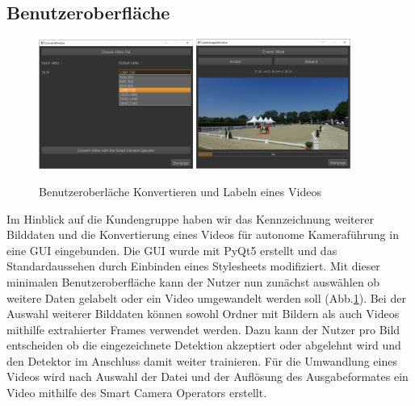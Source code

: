 \subsection*{Benutzeroberfläche}

\begin{figure}[b]
\centering
\includegraphics[width=0.45\textwidth]{./img/GuiConvert2.png}
\includegraphics[width=0.45\textwidth]{./img/GuiLabel.png}
\caption{Benutzeroberläche Konvertieren und Labeln eines Videos}
\label{fig:gui}
\end{figure}

Im Hinblick auf die Kundengruppe haben wir das Kennzeichnung weiterer Bilddaten und die Konvertierung eines Videos für autonome Kameraführung in eine GUI eingebunden. Die GUI wurde mit PyQt5 erstellt und das Standardaussehen durch Einbinden eines Stylesheets modifiziert. Mit dieser minimalen Benutzeroberfläche kann der Nutzer nun zunächst auswählen ob weitere Daten gelabelt oder ein Video umgewandelt werden soll (Abb.\ref{fig:gui}). Bei der Auswahl weiterer Bilddaten können sowohl Ordner mit Bildern als auch Videos mithilfe extrahierter Frames verwendet werden. Dazu kann der Nutzer pro Bild entscheiden ob die eingezeichnete Detektion akzeptiert oder abgelehnt wird und den Detektor im Anschluss damit weiter trainieren. Für die Umwandlung eines Videos wird nach Auswahl der Datei und der Auflösung des Ausgabeformates ein Video mithilfe des Smart Camera Operators erstellt.


